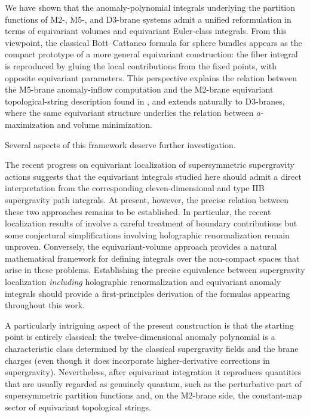 \documentclass[11pt,a4paper]{article}
\theoremstyle{definition}
\theoremstyle{identity}
\theoremstyle{remark}
\begin{document}
We have shown that the anomaly-polynomial integrals underlying the partition functions of
M2-, M5-, and D3-brane systems admit a unified reformulation in terms of equivariant volumes and
equivariant Euler-class integrals. From this viewpoint, the classical Bott--Cattaneo formula for
sphere bundles appears as the compact prototype of a more general equivariant construction:
the fiber integral is reproduced by gluing the local contributions from the fixed points, with
opposite equivariant parameters. This perspective explains the relation between the M5-brane
anomaly-inflow computation and the M2-brane equivariant topological-string description found in
\cite{Hristov:2026tde}, and extends naturally to D3-branes, where the same equivariant structure
underlies the relation between $a$-maximization and volume minimization.

Several aspects of this framework deserve further investigation.

\medskip

The recent progress on equivariant localization of supersymmetric supergravity actions suggests
that the equivariant integrals studied here should admit a direct interpretation from the
corresponding eleven-dimensional and type IIB supergravity path integrals. At present, however,
the precise relation between these two approaches remains to be established. In particular, the
recent localization results of
\cite{Couzens:2026xmi,BenettiGenolini:2026cdw,BenettiGenolini:2026cyc}
involve a careful treatment of boundary contributions but some conjectural simplifications involving holographic renormalization remain unproven. Conversely,
the equivariant-volume approach provides a natural mathematical framework for defining
integrals over the non-compact spaces that arise in these problems. Establishing the precise
equivalence between supergravity localization \emph{including} holographic renormalization and equivariant anomaly integrals should provide a
first-principles derivation of the formulas appearing throughout this work.

\medskip

A particularly intriguing aspect of the present construction is that the starting point is entirely
classical: the twelve-dimensional anomaly polynomial is a characteristic class determined by
the classical supergravity fields and the brane charges (even though it does incorporate higher-derivative corrections in supergravity). Nevertheless, after equivariant
integration it reproduces quantities that are usually regarded as genuinely quantum, such as
the perturbative part of supersymmetric partition functions and, on the M2-brane side, the
constant-map sector of equivariant topological strings.
\end{document}
